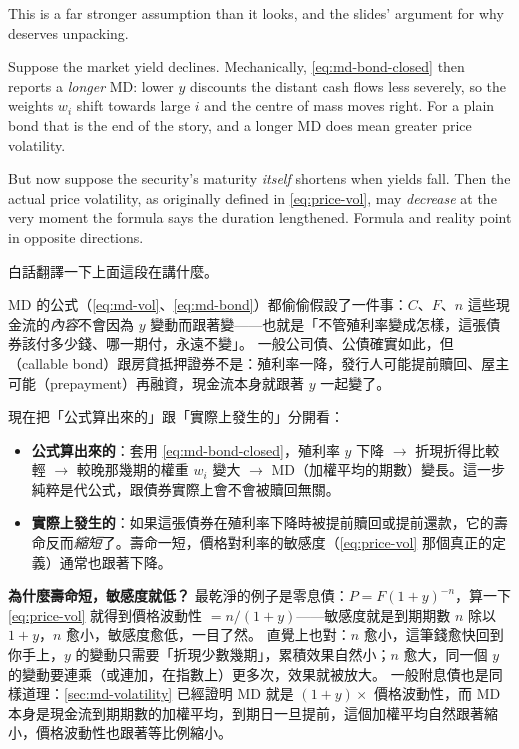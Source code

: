 \suppstart
This is a far stronger assumption than it looks, and the slides' argument for why deserves unpacking.

Suppose the market yield declines.
Mechanically, \eqref{eq:md-bond-closed} then reports a \emph{longer} MD: lower $y$ discounts the distant cash flows less severely, so the weights $w_{i}$ shift towards large $i$ and the centre of mass moves right.
For a plain bond that is the end of the story, and a longer MD does mean greater price volatility.

But now suppose the security's maturity \emph{itself} shortens when yields fall.
Then the actual price volatility, as originally defined in \eqref{eq:price-vol}, may \emph{decrease} at the very moment the formula says the duration lengthened.
Formula and reality point in opposite directions.

\begin{remark}
	白話翻譯一下上面這段在講什麼。

	MD 的公式（\eqref{eq:md-vol}、\eqref{eq:md-bond}）都偷偷假設了一件事：$C$、$F$、$n$ 這些現金流的\emph{內容}不會因為 $y$ 變動而跟著變——也就是「不管殖利率變成怎樣，這張債券該付多少錢、哪一期付，永遠不變」。
	一般公司債、公債確實如此，但（callable bond）跟房貸抵押證券不是：殖利率一降，發行人可能提前贖回、屋主可能（prepayment）再融資，現金流本身就跟著 $y$ 一起變了。

	現在把「公式算出來的」跟「實際上發生的」分開看：

	\begin{itemize}[nosep]
		\item \textbf{公式算出來的}：套用 \eqref{eq:md-bond-closed}，殖利率 $y$ 下降 $\to$ 折現折得比較輕 $\to$ 較晚那幾期的權重 $w_i$ 變大 $\to$ MD（加權平均的期數）變長。這一步純粹是代公式，跟債券實際上會不會被贖回無關。
		\item \textbf{實際上發生的}：如果這張債券在殖利率下降時被提前贖回或提前還款，它的壽命反而\emph{縮短}了。壽命一短，價格對利率的敏感度（\eqref{eq:price-vol} 那個真正的定義）通常也跟著下降。
	\end{itemize}

	\textbf{為什麼壽命短，敏感度就低？}
	最乾淨的例子是零息債：$P=F(1+y)^{-n}$，算一下 \eqref{eq:price-vol} 就得到價格波動性 $=n/(1+y)$——敏感度就是到期期數 $n$ 除以 $1+y$，$n$ 愈小，敏感度愈低，一目了然。
	直覺上也對：$n$ 愈小，這筆錢愈快回到你手上，$y$ 的變動只需要「折現少數幾期」，累積效果自然小；$n$ 愈大，同一個 $y$ 的變動要連乘（或連加，在指數上）更多次，效果就被放大。
	一般附息債也是同樣道理：\autoref{sec:md-volatility} 已經證明 MD 就是 $(1+y)\times$ 價格波動性，而 MD 本身是現金流到期期數的加權平均，到期日一旦提前，這個加權平均自然跟著縮小，價格波動性也跟著等比例縮小。
\end{remark}
\suppend

